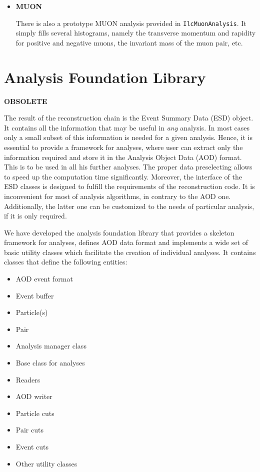 \documentclass[12pt,a4paper,twoside]{article}
\begin{document}
{\begin{itemize}
\begin{itemize}
    \vspace{-0.1cm}
  \item[ ] \textbf{MUON}

    There is also a prototype MUON analysis provided in
    \texttt{IlcMuonAnalysis}. It simply fills several histograms, namely
    the transverse momentum and rapidity for positive and negative muons,
    the invariant mass of the muon pair, etc.
  \end{itemize}

\end{itemize}


\newpage
\section{Analysis Foundation Library}

{\bf OBSOLETE}

The result of the reconstruction chain is the Event Summary Data (ESD) 
object. It contains all the information that may
be useful in {\it any} analysis. In most cases only a small subset 
of this information is needed for a given analysis.
Hence, it is essential to provide a framework for analyses, where
user can extract only the information required and store it in 
the Analysis Object Data (AOD) format. This is to be used in all his
further analyses. The proper data preselecting allows to speed up 
the computation time significantly. Moreover, the interface of the ESD classes is
designed to fulfill the requirements of the reconstruction
code. It is inconvenient for most of analysis algorithms,
in contrary to the AOD one. Additionally, the latter one can be customized
to the needs of particular analysis, if it is only required.

We have developed the analysis foundation library that 
provides a skeleton framework for analyses, defines AOD data format
and implements a wide set of basic utility classes which facilitate 
the creation of individual analyses.
It contains classes that define the following entities:

\begin{itemize}
\item AOD event format
\item Event buffer
\item Particle(s)
\item Pair
\item Analysis manager class 
\item Base class for analyses
\item Readers 
\item AOD writer 
\item Particle cuts 
\item Pair cuts 
\item Event cuts 
\item Other utility classes 
\end{itemize}

}
\end{document}
